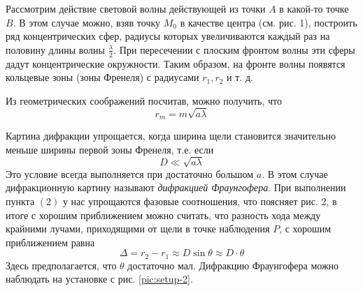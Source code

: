 \documentclass[12pt, a4paper]{article}
\begin{document}
Рассмотрим действие световой волны действующей из точки $A$ в какой-то точке $B$.
В этом случае можно, взяв точку $M_0$ в качестве центра (см. рис. 1), построить ряд
концентрических сфер, радиусы которых увеличиваются каждый раз на половину
длины волны $\frac{\lambda}{2}$. При пересечении с плоским фронтом волны эти сферы дадут
концентрические окружности. Таким образом, на фронте волны появятся кольцевые зоны (зоны Френеля)
с радиусами $r_1, r_2$ и т. д.

Из геометрических соображений посчитав, можно получить, что
\begin{equation}
  r_m = m \sqrt{a \lambda}
\end{equation}

Картина дифракции упрощается, когда ширина щели становится значительно меньше ширины первой зоны Френеля, т.е. если
\begin{equation}
  D \ll\sqrt{a \lambda}
\end{equation}
Это условие всегда выполняется при достаточно большом $a$. В этом случае дифракционную картину
называют \textit{дифракцией Фраунгофера}. При выполнении пункта $(2)$ у нас упрощаются фазовые
соотношения, что поясняет рис. 2, в итоге с хорошим приближением можно считать, что разность
хода между крайними лучами, приходящими от щели в точке наблюдения $P$, с хорошим приближением равна
\begin{equation}
  \Delta = r_2 - r_1 \approx D \sin \theta \approx D \cdot \theta
\end{equation}
Здесь предполагается, что $\theta$ достаточно мал.
Дифракцию Фраунгофера можно наблюдать на установке с рис. \ref{pic:setup-2}.
\end{document}
